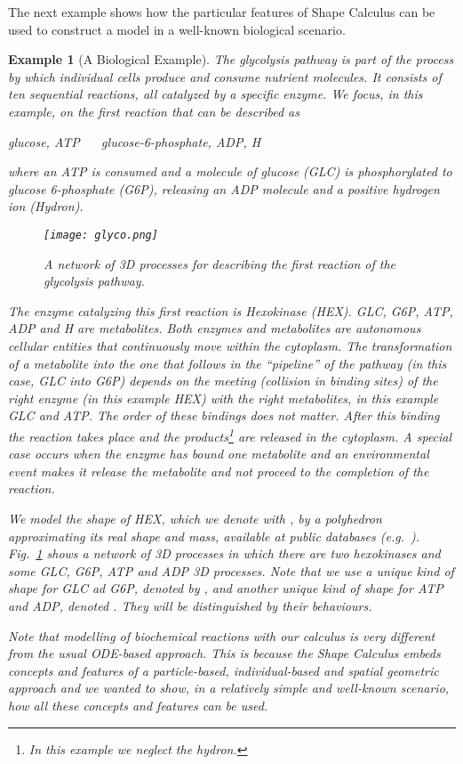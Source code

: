 \documentclass[11pt]{article}
\newtheorem{example}{Example}
\begin{document}
The next example shows how the particular features of Shape Calculus can be used to construct a model in a well-known biological scenario.

\begin{example}[A Biological Example]
\label{sec:example}
The \emph{glycolysis} pathway is part of the process by which individual cells produce and consume
nutrient molecules. It consists of ten sequential reactions, all catalyzed by a specific enzyme. We focus, in this example, on the first reaction that can be described as

\emph{glucose, ATP  \,\, \ce {<=>} \,\, glucose-6-phosphate, ADP, H}

\noindent where an ATP is consumed and a molecule of glucose (GLC) is phosphorylated to glucose 6-phosphate (G6P), releasing an ADP molecule and a positive hydrogen ion (Hydron).

\begin{figure}[tbh]
\begin{center}
\texttt{[image: glyco.png]}
\end{center}
\caption{A network of 3D processes for describing the first reaction of the glycolysis pathway.}
\label{fig:glyco}
\end{figure}

The enzyme catalyzing this first reaction is \emph{Hexokinase} (HEX). GLC, G6P, ATP, ADP and H are metabolites. Both enzymes and metabolites are autonomous cellular entities that continuously move within the cytoplasm. The transformation of a metabolite into the one that follows in the ``pipeline'' of the pathway (in this case, GLC into G6P) depends on the meeting (collision in binding sites) of the right enzyme (in this example HEX) with the right metabolites, in this example GLC and ATP. The order of these bindings does not matter. After this binding the reaction takes place and the products\footnote{In this example we neglect the hydron.} are released in the cytoplasm. A special case occurs when the enzyme has bound one metabolite and an environmental event makes it release the metabolite and not proceed to the completion of the reaction.

We model the shape of HEX, which we denote with , by a polyhedron approximating its real shape and mass, available at public databases (e.g.\ \cite{PDB}). Fig.~\ref{fig:glyco} shows a network of 3D processes in which there are two hexokinases and some GLC, G6P, ATP and ADP 3D processes. Note that we use a unique kind of shape for GLC ad G6P, denoted by , and another unique kind of shape for ATP and ADP, denoted . They will be distinguished by their behaviours.

Note that modelling of biochemical reactions with our calculus is very different from the usual ODE-based approach. This is because the Shape Calculus embeds concepts and features of a particle-based, individual-based and spatial geometric approach and we wanted to show, in a relatively simple and well-known scenario, how all these concepts and features can be used.
\end{example}
\end{document}
